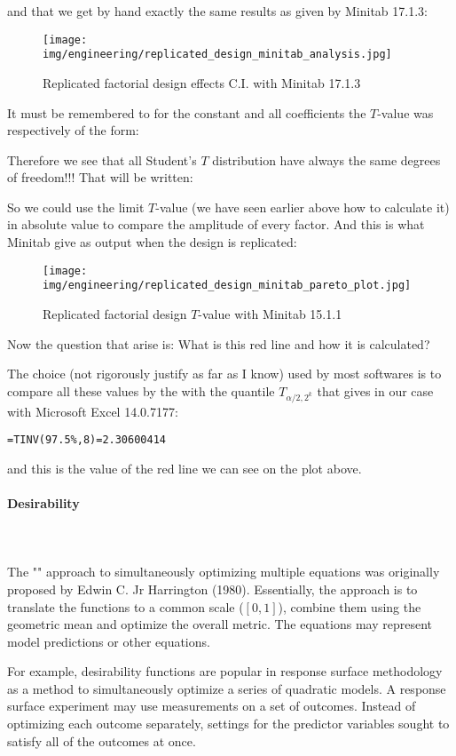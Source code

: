 	and that we get by hand exactly the same results as given by Minitab 17.1.3:
	\begin{figure}[H]
		\begin{center}
		\texttt{[image: img/engineering/replicated\_design\_minitab\_analysis.jpg]}
		\end{center}	
		\caption[]{Replicated factorial design effects C.I. with Minitab 17.1.3}
	\end{figure}
	It must be remembered to for the constant and all coefficients the $T$-value was respectively of the form:
	
	Therefore we see that all Student's $T$ distribution have always the same degrees of freedom!!! That will be written:
	
	So we could use the limit $T$-value (we have seen earlier above how to calculate it) in absolute value to compare the amplitude of every factor. And this is what Minitab give as output when the design is replicated:
	\begin{figure}[H]
		\centering
		\texttt{[image: img/engineering/replicated\_design\_minitab\_pareto\_plot.jpg]}
		\caption[]{Replicated factorial design $T$-value with Minitab 15.1.1}
	\end{figure}
	Now the question that arise is: What is this red line and how it is calculated?
	
	The choice (not rigorously justify as far as I know) used by most softwares is to compare all these values by the with the quantile $T_{\alpha/2,2^k}$ that gives in our case with Microsoft Excel 14.0.7177:
	\begin{center}
		\texttt{=TINV(97.5\%,8)=2.30600414}
	\end{center}
	and this is the value of the red line we can see on the plot above.
	
	\paragraph{Desirability}\mbox{}\\\\
	The "" approach to simultaneously optimizing multiple equations was originally proposed by Edwin C. Jr Harrington (1980). Essentially, the approach is to translate the functions to a common scale ($[0, 1]$), combine them using the geometric mean and optimize the overall metric. The equations may represent model predictions or other equations.

	For example, desirability functions are popular in response surface methodology as a method to simultaneously optimize a series of quadratic models. A response surface experiment may use measurements on a set of outcomes. Instead of optimizing each outcome separately, settings for the predictor variables sought to satisfy all of the outcomes at once.

